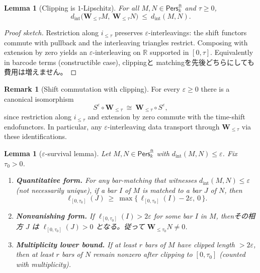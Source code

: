 \documentclass[11pt]{article}
\newcommand{\Pers}{\mathsf{Pers}}
\numberwithin{equation}{section}
\newtheorem{lemma}[theorem]{Lemma}
\theoremstyle{definition}
\newtheorem{remark}[theorem]{Remark}
\begin{document}
\begin{lemma}[Clipping is $1$-Lipschitz]\label{I:lem:clip-1lip}
For all \(M,N\in\Pers^{\mathrm{ft}}_k\) and \(\tau\ge 0\),
\[
d_{\mathrm{int}}\bigl(\mathbf{W}_{\le \tau}M,\ \mathbf{W}_{\le \tau}N\bigr)\ \le\ d_{\mathrm{int}}(M,N).
\]
\end{lemma}

\begin{proof}[Proof sketch]
Restriction along \(i_{\le\tau}\) preserves \(\varepsilon\)-interleavings: the shift functors commute with pullback and the interleaving triangles restrict. Composing with extension by zero yields an \(\varepsilon\)-interleaving on \(\mathbb{R}\) supported in \([0,\tau]\). Equivalently in barcode terms (constructible case), clippingと matchingを先後どちらにしても費用は増えません。
\end{proof}

\begin{remark}[Shift commutation with clipping]\label{I:rk:shift-clip}
For every \(\varepsilon\ge 0\) there is a canonical isomorphism
\[
S^\varepsilon\circ \mathbf{W}_{\le\tau}\ \cong\ \mathbf{W}_{\le\tau}\circ S^\varepsilon,
\]
since restriction along \(i_{\le\tau}\) and extension by zero commute with the time-shift endofunctors. In particular, any \(\varepsilon\)-interleaving data transport through \(\mathbf{W}_{\le\tau}\) via these identifications.
\end{remark}

\begin{lemma}[$\varepsilon$-survival lemma]\label{I:lem:survive}
Let \(M,N\in\Pers^{\mathrm{ft}}_k\) with \(d_{\mathrm{int}}(M,N)\le\varepsilon\). Fix \(\tau_0>0\).
\begin{enumerate}\itemsep0.2em
\item \textbf{Quantitative form.} For \emph{any} bar-matching that witnesses \(d_{\mathrm{int}}(M,N)\le\varepsilon\) (not necessarily unique), if a bar \(I\) of \(M\) is matched to a bar \(J\) of \(N\), then
\[
\ell_{[0,\tau_0]}(J)\ \ge\ \max\bigl\{\,\ell_{[0,\tau_0]}(I)-2\varepsilon,\ 0\,\bigr\}.
\]
\item \textbf{Nonvanishing form.} If \(\ell_{[0,\tau_0]}(I)>2\varepsilon\) for some bar \(I\) in \(M\), thenその相方 \(J\) は \(\ell_{[0,\tau_0]}(J)>0\) となる。従って \(\mathbf{W}_{\le \tau_0}N\neq 0\).
\item \textbf{Multiplicity lower bound.} If at least \(r\) bars of \(M\) have clipped length \(>\!2\varepsilon\), then at least \(r\) bars of \(N\) remain nonzero after clipping to \([0,\tau_0]\) (counted with multiplicity).
\end{enumerate}
\end{lemma}
\end{document}
